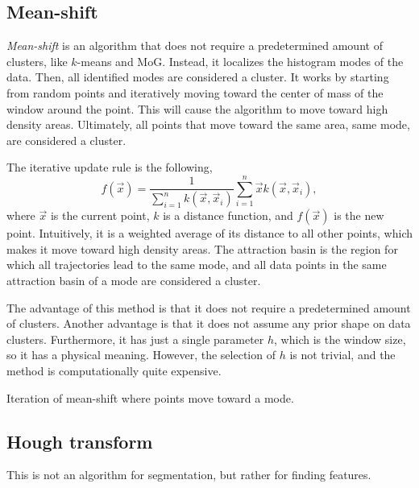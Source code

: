 \subsection{Mean-shift}

\textit{Mean-shift} is an algorithm that does not require a predetermined
amount of clusters, like $k$-means and MoG. Instead, it localizes the histogram
modes of the data. Then, all identified modes are considered a cluster. It
works by starting from random points and iteratively moving toward the center
of mass of the window around the point. This will cause the algorithm to move
toward high density areas. Ultimately, all points that move toward the same
area, \ie same mode, are considered a cluster.

The iterative update rule is the following, \[
  f(\vec{x}) = \frac{1}{\sum_{i=1}^n k(\vec{x},\vec{x}_i)} \sum_{i=1}^n \vec{x} k(\vec{x},\vec{x}_i)
,\]
where $\vec{x}$ is the current point, $k$ is a distance function, and
$f(\vec{x})$ is the new point. Intuitively, it is a weighted average of its
distance to all other points, which makes it move toward high density areas.
The attraction basin is the region for which all trajectories lead to the same
mode, and all data points in the same attraction basin of a mode are considered
a cluster.

The advantage of this method is that it does not require a predetermined
amount of clusters. Another advantage is that it does not assume any prior
shape on data clusters. Furthermore, it has just a single parameter $h$,
which is the window size, so it has a physical meaning. However, the
selection of $h$ is not trivial, and the method is computationally quite
expensive.

\begin{marginfigure}
    \centering
    \caption{Iteration of mean-shift where points move toward a mode.}
    \label{fig:mean-shift}
\end{marginfigure}

\subsection{Hough transform}

\begin{remark}
This is not an algorithm for segmentation, but rather for finding features.
\end{remark}

